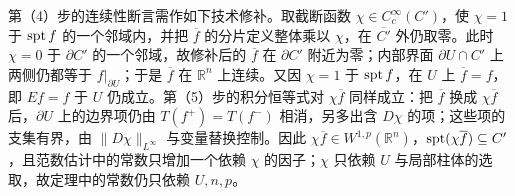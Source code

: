 \documentclass[../../main.tex]{subfiles}%
\begin{document}
\begin{remark}\label{remark:ch04-def-4-6-边界}
第（4）步的连续性断言需作如下技术修补。取截断函数 $\chi\in C_c^\infty(C')$，使 $\chi=1$ 于 $\operatorname{spt} f$ 的一个邻域内，并把 $\overline{f}$ 的分片定义整体乘以 $\chi$，在 $\overline{C'}$ 外仍取零。此时 $\chi=0$ 于 $\partial C'$ 的一个邻域，故修补后的 $\overline{f}$ 在 $\partial C'$ 附近为零；内部界面 $\partial U\cap C'$ 上两侧仍都等于 $f|_{\partial U}$；于是 $\overline{f}$ 在 $\mathbb{R}^n$ 上连续。又因 $\chi=1$ 于 $\operatorname{spt} f$，在 $U$ 上 $\overline{f}=f$，即 $Ef=f$ 于 $U$ 仍成立。第（5）步的积分恒等式对 $\chi\overline{f}$ 同样成立：把 $\overline{f}$ 换成 $\chi\overline{f}$ 后，$\partial U$ 上的边界项仍由 $T(f^+)=T(f^-)$ 相消，另多出含 $D\chi$ 的项；这些项的支集有界，由 $\lVert D\chi\rVert_{L^\infty}$ 与变量替换控制。因此 $\chi\overline{f}\in W^{1,p}(\mathbb{R}^n)$，$\operatorname{spt}(\chi\overline{f})\subseteq C'$，且范数估计中的常数只增加一个依赖 $\chi$ 的因子；$\chi$ 只依赖 $U$ 与局部柱体的选取，故定理中的常数仍只依赖 $U,n,p$。
\end{remark}
\end{document}
